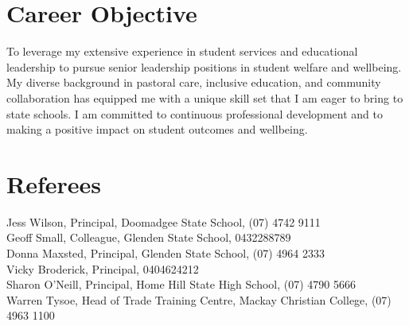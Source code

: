 \documentclass[11pt,a4paper]{article}
\begin{document}
\section*{Career Objective}
To leverage my extensive experience in student services and educational leadership to pursue senior leadership positions in student welfare and wellbeing. My diverse background in pastoral care, inclusive education, and community collaboration has equipped me with a unique skill set that I am eager to bring to state schools. I am committed to continuous professional development and to making a positive impact on student outcomes and wellbeing.

\section*{Referees}
Jess Wilson, Principal, Doomadgee State School, (07) 4742 9111 \\
Geoff Small, Colleague, Glenden State School, 0432288789 \\
Donna Maxsted, Principal, Glenden State School, (07) 4964 2333 \\
Vicky Broderick, Principal, 0404624212 \\
Sharon O'Neill, Principal, Home Hill State High School, (07) 4790 5666 \\
Warren Tysoe, Head of Trade Training Centre, Mackay Christian College, (07) 4963 1100
\end{document}
